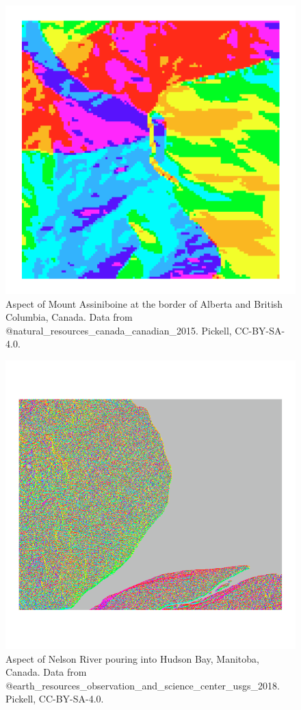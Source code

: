 \documentclass[
]{book}
\begin{document}
\begin{figure}
\includegraphics[width=0.75\linewidth]{images/09-mount-assiniboine-aspect} \caption{Aspect of Mount Assiniboine at the border of Alberta and British Columbia, Canada. Data from @natural_resources_canada_canadian_2015. Pickell, CC-BY-SA-4.0.}\label{fig:9-mount-assiniboine-aspect}
\end{figure}

\begin{figure}
\includegraphics[width=0.75\linewidth]{images/09-nelson-river-aspect} \caption{Aspect of Nelson River pouring into Hudson Bay, Manitoba, Canada. Data from @earth_resources_observation_and_science_center_usgs_2018. Pickell, CC-BY-SA-4.0.}\label{fig:9-nelson-river-aspect}
\end{figure}
\end{document}
